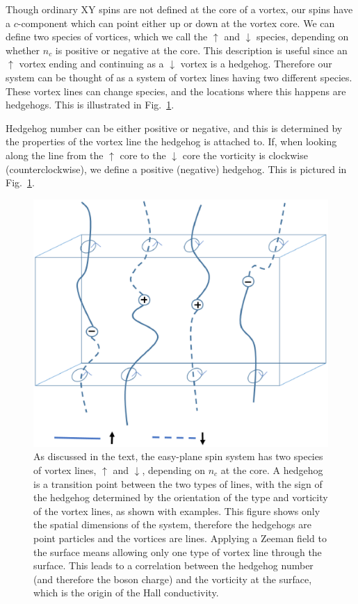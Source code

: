 Though ordinary XY spins are not defined at the core of a vortex, our spins have a $c$-component which can point either up or down at the vortex core. We can define two species of vortices, which we call the $\uparrow$ and $\downarrow$ species, depending on whether $n_c$ is positive or negative at the core. This description is useful since an $\uparrow$ vortex ending and continuing as a $\downarrow$ vortex is a hedgehog. Therefore our system can be thought of as a system of vortex lines having two different species. These vortex lines can change species, and the locations where this happens are hedgehogs.\cite{LesikSenthil} This is illustrated in Fig.~\ref{monopoles}.

Hedgehog number can be either positive or negative, and this is determined by the properties of the vortex line the hedgehog is attached to.
If, when looking along the line from the $\uparrow$ core to the $\downarrow$ core the vorticity is clockwise (counterclockwise), we define a positive (negative) hedgehog.  This is pictured in Fig.~\ref{monopoles}.


\begin{figure}
\includegraphics[width=0.6\linewidth]{figures/monopoles.eps}
\caption{As discussed in the text, the easy-plane spin system has two species of vortex lines, $\uparrow$ and $\downarrow$, depending on $n_c$ at the core. A hedgehog is a transition point between the two types of lines, with the sign of the hedgehog determined by the orientation of the type and vorticity of the vortex lines, as shown with examples. This figure shows only the spatial dimensions of the system, therefore the hedgehogs are point particles and the vortices are lines. Applying a Zeeman field to the surface means allowing only one type of vortex line through the surface. This leads to a correlation between the hedgehog number (and therefore the boson charge) and the vorticity at the surface, which is the origin of the Hall conductivity.}
\label{monopoles}
\end{figure}


